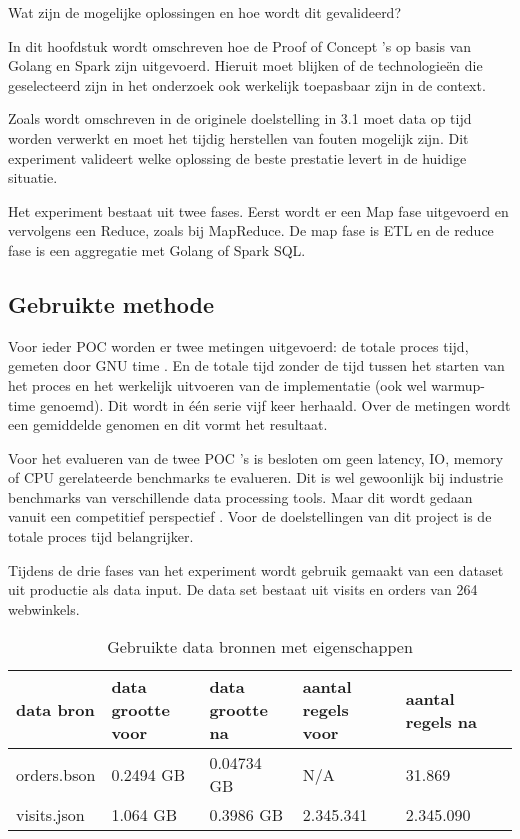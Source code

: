 Wat zijn de mogelijke oplossingen en hoe wordt dit gevalideerd?

In dit hoofdstuk wordt omschreven hoe de Proof of Concept 's op basis van Golang en Spark zijn uitgevoerd. Hieruit moet blijken of de technologieën die geselecteerd zijn in het onderzoek ook werkelijk toepasbaar zijn in de context.

Zoals wordt omschreven in de originele doelstelling in 3.1 moet data op tijd worden verwerkt en moet het tijdig herstellen van fouten mogelijk zijn. Dit experiment valideert welke oplossing de beste prestatie levert in de huidige situatie.

Het experiment bestaat uit twee fases. Eerst wordt er een Map fase uitgevoerd en vervolgens een Reduce, zoals bij MapReduce. De map fase is 
ETL en de reduce fase is een aggregatie met Golang of Spark SQL.

\subsection{Gebruikte methode}

Voor ieder POC worden er twee metingen uitgevoerd: de totale proces tijd, gemeten door GNU time \parencite{gnu_time}. En de totale tijd zonder de tijd tussen het starten van het proces en het werkelijk uitvoeren van de implementatie (ook wel warmup-time genoemd). Dit wordt in één serie vijf keer herhaald. Over de metingen wordt een gemiddelde genomen en dit vormt het resultaat.

Voor het evalueren van de twee POC 's is besloten om geen latency, IO, memory of CPU gerelateerde benchmarks te evalueren. Dit is wel gewoonlijk bij industrie benchmarks van verschillende data processing tools. Maar dit wordt gedaan vanuit een competitief perspectief  \parencite{ousterhout2015making}. Voor de doelstellingen van dit project is de totale proces tijd belangrijker.

Tijdens de drie fases van het experiment wordt gebruik gemaakt van een dataset uit productie als data input. De data set bestaat uit visits en orders van 264 webwinkels.

\begin{table}[h]
\centering
\caption{Gebruikte data bronnen met eigenschappen}
\label{tab:datasets}
\begin{tabular}{|l|l|l|l|l|l|}
\hline
data bron & data grootte voor & data grootte na & aantal regels voor & aantal regels na \\ \hline
orders.bson    &  0.2494 GB & 0.04734 GB       & N/A                & 31.869           \\ \hline
visits.json & 1.064 GB               & 0.3986 GB      & 2.345.341          & 2.345.090        \\ \hline
\end{tabular}
\end{table}


